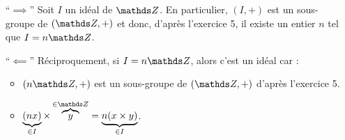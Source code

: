 \begin{prv}[2.]
	\begin{itemize}
		\item[``$\implies$''] Soit $I$\/ un idéal de $\Z$. En particulier, $(I,+)$\/ est un sous-groupe de $(\Z, +)$ et donc, d'après l'{\sc exercice 5}, il existe un entier $n$\/ tel que $I = n\Z$.
		\item[``$\impliedby$\/''] Réciproquement, si $I = n\Z$, alors c'est un idéal car :
			\begin{itemize}
				\item $(n\Z, +)$\/ est un sous-groupe de $(\Z, +)$\/ d'après l'{\sc exercice}\/ 5.
				\item $\underbrace{(nx)}_{\in I} \times \overbrace{y}^{\in \Z} = \underbrace{n(x \times y)}_{\in I}$.
			\end{itemize}
	\end{itemize}
\end{prv}



